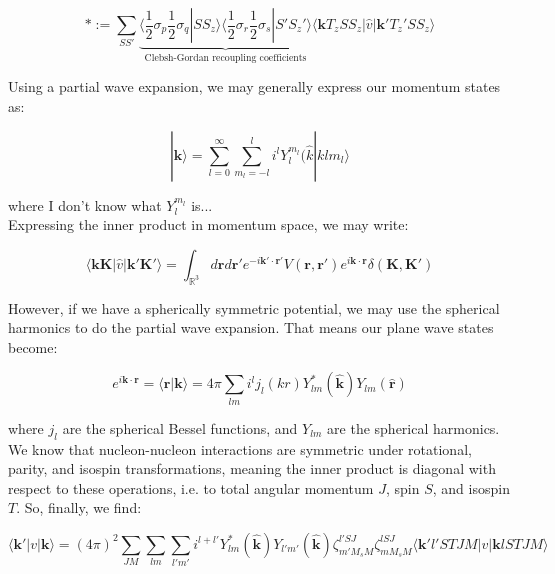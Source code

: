 \documentclass[10pt]{report}
\begin{document}
	\begin{equation}
		\ast := \sum_{SS'} \underbrace{\langle\frac{1}{2}\sigma_p\frac{1}{2}\sigma_q|SS_z\rangle\langle\frac{1}{2}\sigma_r\frac{1}{2}\sigma_s|S'S_z'\rangle}_{\text{Clebsh-Gordan recoupling coefficients}} \langle \bm{k}T_zSS_z |\hat{v}| \bm{k}'T_z'SS_z\rangle
	\end{equation}
	
	Using a partial wave expansion, we may generally express our momentum states as:
	
	\begin{equation}
		|\bm{k}\rangle = \sum_{l=0}^{\infty}\sum_{m_l=-l}^{l}i^l Y_l^{m_l}(\hat{k}|klm_l\rangle
	\end{equation}
	
	where I don't know what $Y_l^{m_l}$ is...\\
	Expressing the inner product in momentum space, we may write:
	
	\begin{equation}
		\langle\bm{k}\bm{K}|\hat{v}|\bm{k}'\bm{K}'\rangle = \int_{\mathbb{R}^3} d\bm{r}d\bm{r}' e^{-i\bm{k}'\cdot\bm{r}'}V(\bm{r},\bm{r}')e^{i\bm{k}\cdot\bm{r}}\delta(\bm{K},\bm{K}')
	\end{equation}
	
	However, if we have a spherically symmetric potential, we may use the spherical harmonics to do the partial wave expansion. That means our plane wave states become:
	
	\begin{equation}
		e^{i\bm{k}\cdot\bm{r}} = \langle \bm{r}|\bm{k}\rangle = 4\pi \sum_{lm}i^lj_l(kr)Y_{lm}^*(\hat{\bm{k}})Y_{lm}(\hat{\bm{r}})
	\end{equation}
	
	where $j_l$ are the spherical Bessel functions, and $Y_{lm}$ are the spherical harmonics.\\
	
	We know that nucleon-nucleon interactions are symmetric under rotational, parity, and isospin transformations, meaning the inner product is diagonal with respect to these operations, i.e. to total angular momentum $J$, spin $S$, and isospin $T$. So, finally, we find:
	
	\begin{equation}
		\langle \bm{k}'|v|\bm{k}\rangle = (4\pi)^2\sum_{JM}\sum_{lm}\sum_{l'm'} i^{l+l'} Y_{lm}^*(\hat{\bm{k}})Y_{l'm'}(\hat{\bm{k}})\zeta_{m'M_sM}^{l'SJ}\zeta_{mM_sM}^{lSJ}\langle \bm{k}'l'STJM|v|\bm{k}lSTJM\rangle
	\end{equation}
	
\end{document}
